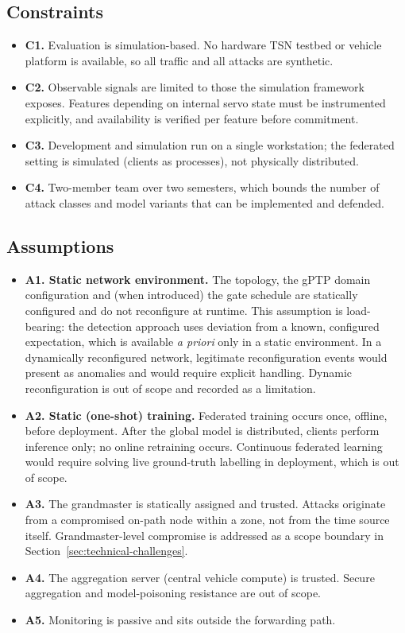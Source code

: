 \subsection*{Constraints}
\begin{itemize}
  \item \textbf{C1.} Evaluation is simulation-based. No hardware TSN testbed or
        vehicle platform is available, so all traffic and all attacks are synthetic.
  \item \textbf{C2.} Observable signals are limited to those the simulation framework
        exposes. Features depending on internal servo state must be instrumented
        explicitly, and availability is verified per feature before commitment.
  \item \textbf{C3.} Development and simulation run on a single workstation; the
        federated setting is simulated (clients as processes), not physically
        distributed.
  \item \textbf{C4.} Two-member team over two semesters, which bounds the number of
        attack classes and model variants that can be implemented and defended.
\end{itemize}

\subsection*{Assumptions}
\begin{itemize}
  \item \textbf{A1. Static network environment.} The topology, the gPTP domain
        configuration and (when introduced) the gate schedule are statically
        configured and do not reconfigure at runtime. This assumption is load-bearing:
        the detection approach uses deviation from a known, configured expectation,
        which is available \emph{a priori} only in a static environment. In a
        dynamically reconfigured network, legitimate reconfiguration events would
        present as anomalies and would require explicit handling. Dynamic
        reconfiguration is out of scope and recorded as a limitation.
  \item \textbf{A2. Static (one-shot) training.} Federated training occurs once,
        offline, before deployment. After the global model is distributed, clients
        perform inference only; no online retraining occurs. Continuous federated
        learning would require solving live ground-truth labelling in deployment,
        which is out of scope.
  \item \textbf{A3.} The grandmaster is statically assigned and trusted. Attacks
        originate from a compromised on-path node within a zone, not from the time
        source itself. Grandmaster-level compromise is addressed as a scope boundary
        in Section~\ref{sec:technical-challenges}.
  \item \textbf{A4.} The aggregation server (central vehicle compute) is trusted.
        Secure aggregation and model-poisoning resistance are out of scope.
  \item \textbf{A5.} Monitoring is passive and sits outside the forwarding path.
\end{itemize}

